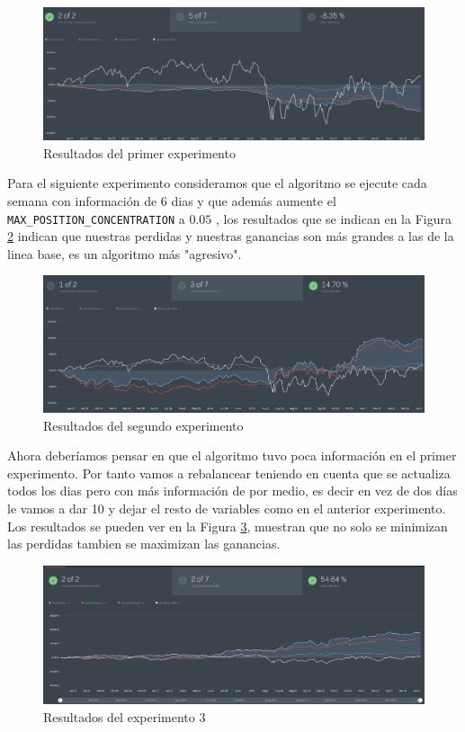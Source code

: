 \documentclass[16pt,a4paper,notitlepage,onecolumn,oneside]{article}
\begin{document}
 \begin{figure}[h]
	\centering
	\includegraphics[width=1.1\linewidth]{experimento_1}
	\caption{Resultados del primer experimento}
	\label{fig:experimento1}
\end{figure}
Para el siguiente experimento consideramos que el algoritmo se ejecute cada semana con información de 6 dias y que además aumente el \verb|MAX_POSITION_CONCENTRATION| a $0.05$ , los resultados que se indican en la Figura \ref{fig:experimento2} indican que nuestras perdidas y nuestras ganancias son más grandes a las de la linea base, es un algoritmo más "agresivo".\\


\begin{figure}[h]
	\centering
	\includegraphics[width=1.1\linewidth]{experimento_2}
	\caption{Resultados del segundo experimento }
	\label{fig:experimento2}
\end{figure}

Ahora deberíamos pensar en que el algoritmo tuvo poca información en el primer experimento. Por tanto vamos a rebalancear teniendo en cuenta que se actualiza todos los dias pero con más información de por medio, es decir en vez de dos días le vamos a dar 10 y dejar el resto de variables como en el anterior experimento.  Los resultados se pueden ver en la Figura \ref{fig:experimento3}, muestran que no solo se minimizan las perdidas tambien se maximizan las ganancias. \\


\begin{figure}[h]
	\centering
	\includegraphics[width=1.1\linewidth]{experimento_3}
	\caption{Resultados del experimento 3}
	\label{fig:experimento3}
\end{figure}
\end{document}
